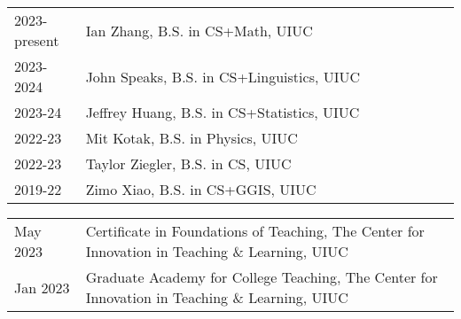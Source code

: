 \documentclass{acmcv}
\begin{document}
    \begin{longtable}{p{0.16\linewidth} p{0.84\linewidth}}
        2023-present & Ian Zhang, B.S. in CS+Math, UIUC \\
        2023-2024 & John Speaks, B.S. in CS+Linguistics, UIUC\\
        2023-24 & Jeffrey Huang, B.S. in CS+Statistics, UIUC \\
        2022-23 & Mit Kotak, B.S. in Physics, UIUC\\
        2022-23 & Taylor Ziegler, B.S. in CS, UIUC\\
        2019-22 & Zimo Xiao, B.S. in CS+GGIS, UIUC\\
    \end{longtable}




    \begin{longtable}{p{0.16\linewidth} p{0.84\linewidth}}
        May 2023 & Certificate in Foundations of Teaching, The Center for Innovation in Teaching \& Learning, UIUC \\

        Jan 2023 & Graduate Academy for College Teaching, The Center for Innovation in Teaching \& Learning, UIUC \\

    \end{longtable}

    



\end{document}
